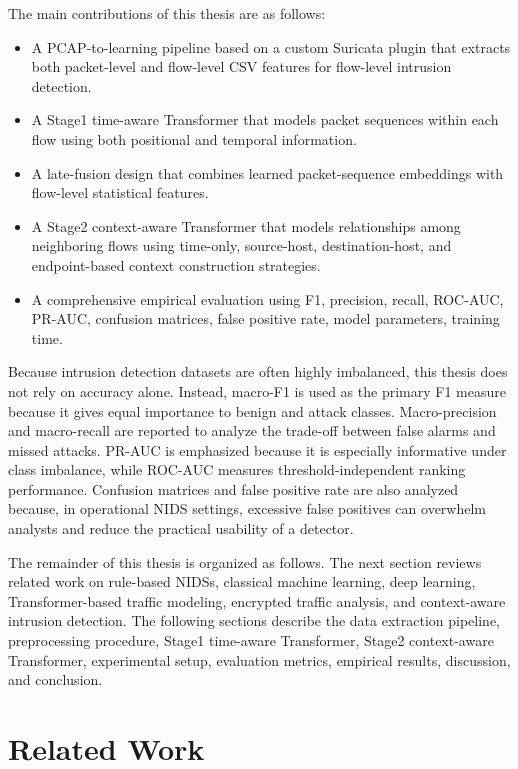 \documentclass[11pt,fleqn]{report}
\begin{document}
The main contributions of this thesis are as follows:

\begin{itemize}
    \item A PCAP-to-learning pipeline based on a custom Suricata plugin that extracts both packet-level and flow-level CSV features for flow-level intrusion detection.
    \item A Stage1 time-aware Transformer that models packet sequences within each flow using both positional and temporal information.
    \item A late-fusion design that combines learned packet-sequence embeddings with flow-level statistical features.
    \item A Stage2 context-aware Transformer that models relationships among neighboring flows using time-only, source-host, destination-host, and endpoint-based context construction strategies.
    \item A comprehensive empirical evaluation using F1, precision, recall, ROC-AUC, PR-AUC, confusion matrices, false positive rate, model parameters, training time.
\end{itemize}

Because intrusion detection datasets are often highly imbalanced, this thesis does not rely on accuracy alone. Instead, macro-F1 is used as the primary F1 measure because it gives equal importance to benign and attack classes. Macro-precision and macro-recall are reported to analyze the trade-off between false alarms and missed attacks. PR-AUC is emphasized because it is especially informative under class imbalance, while ROC-AUC measures threshold-independent ranking performance. Confusion matrices and false positive rate are also analyzed because, in operational NIDS settings, excessive false positives can overwhelm analysts and reduce the practical usability of a detector.

The remainder of this thesis is organized as follows. The next section reviews related work on rule-based NIDSs, classical machine learning, deep learning, Transformer-based traffic modeling, encrypted traffic analysis, and context-aware intrusion detection. The following sections describe the data extraction pipeline, preprocessing procedure, Stage1 time-aware Transformer, Stage2 context-aware Transformer, experimental setup, evaluation metrics, empirical results, discussion, and conclusion.

\chapter{Related Work}
\label{sec:related_work}
\end{document}
